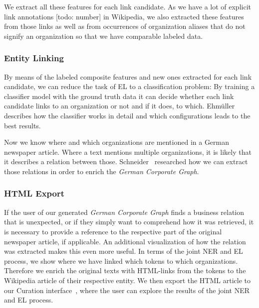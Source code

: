 We extract all these features for each link candidate. As we have a lot of explicit link annotations [todo: number] in Wikipedia, we also extracted these features from those links as well as from occurrences of organization aliases that do not signify an organization so that we have comparable labeled data.\\


\subsubsection{Entity Linking}
By means of the labeled composite features and new ones extracted for each link candidate, we can reduce the task of EL to a classification problem: By training a classifier model with the ground truth data it can decide whether each link candidate links to an organization or not and if it does, to which. Ehmüller~\cite{ehmueller} describes how the classifier works in detail and which configurations leads to the best results.

Now we know where and which organizations are mentioned in a German newspaper article. Where a text mentions multiple organizations, it is likely that it describes a relation between those. Schneider~\cite{schneider} researched how we can extract those relations in order to enrich the \textit{German Corporate Graph}.\\


\subsubsection{HTML Export}
If the user of our generated \textit{German Corporate Graph} finds a business relation that is unexpected, or if they simply want to comprehend how it was retrieved, it is necessary to provide a reference to the respective part of the original newspaper article, if applicable. An additional visualization of how the relation was extracted makes this even more useful. In terms of the joint NER and EL process, we show where we have linked which tokens to which organizations. Therefore we enrich the original texts with HTML-links from the tokens to the Wikipedia article of their respective entity. We then export the HTML article to our Curation interface~\cite{gruner}, where the user can explore the results of the joint NER and EL process.\\
